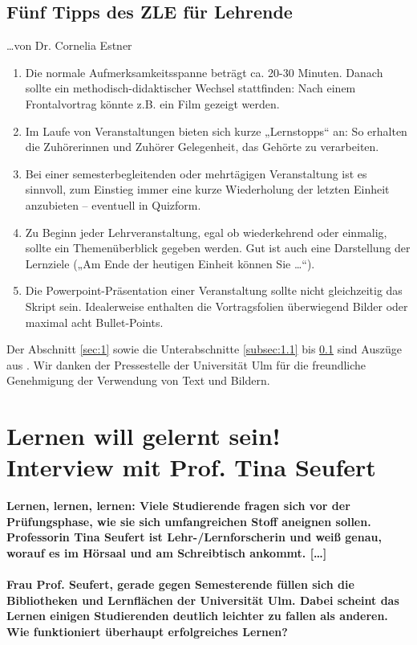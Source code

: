 \subsection{Fünf Tipps des ZLE für Lehrende}
\label{subsec:1.3}

\ldots von Dr. Cornelia Estner

\begin{enumerate}
\item Die normale Aufmerksamkeitsspanne beträgt ca. 20-30 Minuten. Danach sollte
ein methodisch-didaktischer Wechsel stattfinden: Nach einem Frontalvortrag könnte z.B. ein 
Film gezeigt werden.
\item Im Laufe von Veranstaltungen bieten sich kurze „Lernstopps“ an: So erhalten die 
Zuhörerinnen und Zuhörer Gelegenheit, das Gehörte zu verarbeiten.
\item Bei einer semesterbegleitenden oder mehrtägigen Veranstaltung ist es sinnvoll, zum Einstieg immer eine kurze Wiederholung der letzten Einheit anzubieten – eventuell in Quizform. 
\item Zu Beginn jeder Lehrveranstaltung, egal ob wiederkehrend
oder einmalig, sollte ein Themenüberblick gegeben werden. Gut ist auch eine Darstellung der Lernziele („Am Ende der heutigen Einheit können Sie \ldots{}“).
\item Die Powerpoint-Präsentation einer Veranstaltung sollte nicht gleichzeitig das Skript
sein. Idealerweise enthalten die Vortragsfolien überwiegend Bilder oder maximal
acht Bullet-Points.
\end{enumerate}

Der Abschnitt \cref{sec:1} sowie die Unterabschnitte \cref{subsec:1.1} bis \cref{subsec:1.3} sind Auszüge aus . Wir danken der Pressestelle der Universität Ulm für die freundliche Genehmigung der Verwendung von Text und Bildern.

\section[Lernen will gelernt sein]{Lernen will gelernt sein! \\ Interview mit Prof. Tina Seufert}

\textbf{Lernen, lernen, lernen: Viele Studierende fragen sich vor der Prüfungsphase, wie sie sich umfangreichen Stoff aneignen sollen. Professorin Tina Seufert ist Lehr-/Lernforscherin und weiß genau, worauf es im Hörsaal und am Schreibtisch ankommt. [\ldots]}

\paragraph{Frau Prof. Seufert, gerade gegen Semesterende füllen sich die Bibliotheken und Lernflächen der Universität Ulm. Dabei scheint das Lernen einigen Studierenden deutlich leichter zu fallen als anderen. Wie funktioniert überhaupt erfolgreiches Lernen?}

